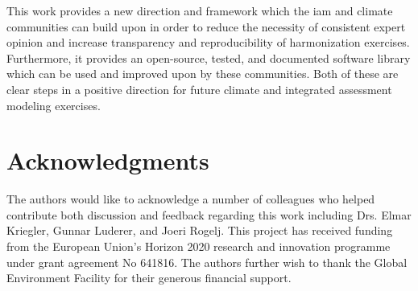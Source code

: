 \documentclass[review]{elsarticle}
\begin{document}
This work provides a new direction and framework which the \gls{iam} and climate
communities can build upon in order to reduce the necessity of consistent expert
opinion and increase transparency and reproducibility of harmonization
exercises. Furthermore, it provides an open-source, tested, and documented
software library which can be used and improved upon by these communities. Both
of these are clear steps in a positive direction for future climate and
integrated assessment modeling exercises.

\section*{Acknowledgments}

The authors would like to acknowledge a number of colleagues who helped
contribute both discussion and feedback regarding this work including Drs. Elmar
Kriegler, Gunnar Luderer, and Joeri Rogelj. This project has received funding
from the European Union’s Horizon 2020 research and innovation programme under
grant agreement No 641816. The authors further wish to thank the Global
Environment Facility for their generous financial support.

\newpage
\printglossaries

\newpage
\section*{\refname}

\end{document}
